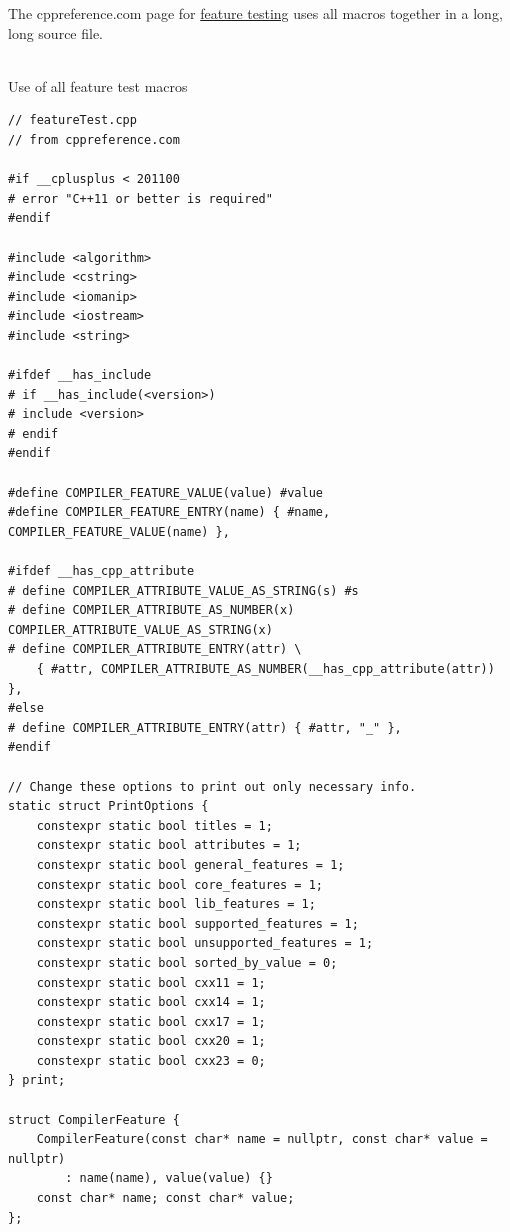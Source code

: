 The cppreference.com page for \href{https://en.cppreference.com/w/cpp/feature_test}{feature testing} uses all macros together in a long, long source file.

\hspace*{\fill} \\ %
\noindent
Use of all feature test macros
\begin{lstlisting}[style=styleCXX]
// featureTest.cpp
// from cppreference.com

#if __cplusplus < 201100
# error "C++11 or better is required"
#endif

#include <algorithm>
#include <cstring>
#include <iomanip>
#include <iostream>
#include <string>

#ifdef __has_include
# if __has_include(<version>)
# include <version>
# endif
#endif

#define COMPILER_FEATURE_VALUE(value) #value
#define COMPILER_FEATURE_ENTRY(name) { #name, COMPILER_FEATURE_VALUE(name) },

#ifdef __has_cpp_attribute
# define COMPILER_ATTRIBUTE_VALUE_AS_STRING(s) #s
# define COMPILER_ATTRIBUTE_AS_NUMBER(x) COMPILER_ATTRIBUTE_VALUE_AS_STRING(x)
# define COMPILER_ATTRIBUTE_ENTRY(attr) \
	{ #attr, COMPILER_ATTRIBUTE_AS_NUMBER(__has_cpp_attribute(attr)) },
#else
# define COMPILER_ATTRIBUTE_ENTRY(attr) { #attr, "_" },
#endif

// Change these options to print out only necessary info.
static struct PrintOptions {
	constexpr static bool titles = 1;
	constexpr static bool attributes = 1;
	constexpr static bool general_features = 1;
	constexpr static bool core_features = 1;
	constexpr static bool lib_features = 1;
	constexpr static bool supported_features = 1;
	constexpr static bool unsupported_features = 1;
	constexpr static bool sorted_by_value = 0;
	constexpr static bool cxx11 = 1;
	constexpr static bool cxx14 = 1;
	constexpr static bool cxx17 = 1;
	constexpr static bool cxx20 = 1;
	constexpr static bool cxx23 = 0;
} print;

struct CompilerFeature {
	CompilerFeature(const char* name = nullptr, const char* value = nullptr)
		: name(name), value(value) {}
	const char* name; const char* value;
};


\end{lstlisting}
